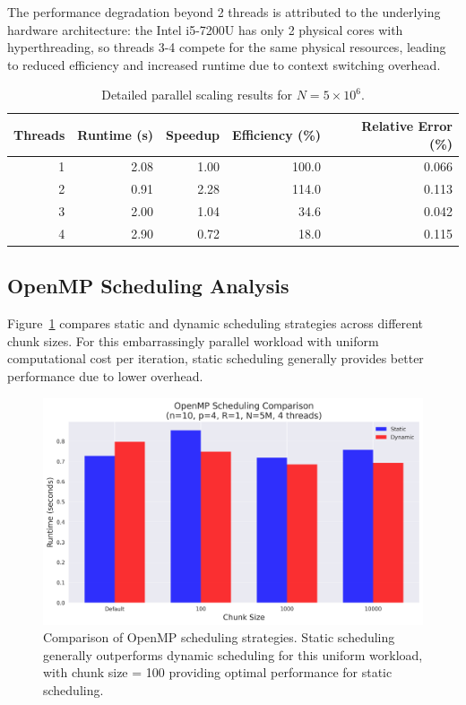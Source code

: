 \documentclass[11pt,a4paper]{article}
\begin{document}
	The performance degradation beyond 2 threads is attributed to the underlying hardware architecture: the Intel i5-7200U has only 2 physical cores with hyperthreading, so threads 3-4 compete for the same physical resources, leading to reduced efficiency and increased runtime due to context switching overhead.
	
	\begin{table}[H]
		\centering
		\caption{Detailed parallel scaling results for $N = 5 \times 10^6$.}
		\label{table:scaling_results}
		\begin{tabular}{rrrrr}
			\toprule
			Threads & Runtime (s) & Speedup & Efficiency (\%) & Relative Error (\%) \\
			\midrule
			1 & 2.08 & 1.00 & 100.0 & 0.066 \\
			2 & 0.91 & 2.28 & 114.0 & 0.113 \\
			3 & 2.00 & 1.04 & 34.6 & 0.042 \\
			4 & 2.90 & 0.72 & 18.0 & 0.115 \\
			\bottomrule
		\end{tabular}
	\end{table}
	
	\subsection{OpenMP Scheduling Analysis}
	
	Figure~\ref{fig:scheduling} compares static and dynamic scheduling strategies across different chunk sizes. For this embarrassingly parallel workload with uniform computational cost per iteration, static scheduling generally provides better performance due to lower overhead.
	
	\begin{figure}[H]
		\centering
		\includegraphics[width=0.9\linewidth]{../plots/schedule_comparison.png}
		\caption{Comparison of OpenMP scheduling strategies. Static scheduling generally outperforms dynamic scheduling for this uniform workload, with chunk size = 100 providing optimal performance for static scheduling.}
		\label{fig:scheduling}
	\end{figure}
	
\end{document}
